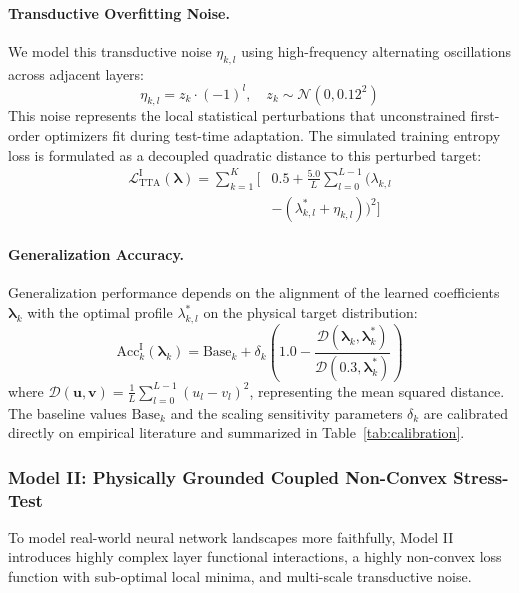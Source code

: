 \paragraph{Transductive Overfitting Noise.} We model this transductive noise $\eta_{k, l}$ using high-frequency alternating oscillations across adjacent layers:
\begin{equation}
\eta_{k, l} = z_k \cdot (-1)^l, \quad z_k \sim \mathcal{N}(0, 0.12^2)
\end{equation}
This noise represents the local statistical perturbations that unconstrained first-order optimizers fit during test-time adaptation. The simulated training entropy loss is formulated as a decoupled quadratic distance to this perturbed target:
\begin{equation}
\label{eq:model1_loss}
\begin{aligned}
\mathcal{L}_{\text{TTA}}^{\text{I}}(\boldsymbol{\lambda}) = \sum_{k=1}^K \bigg[ &0.5 + \frac{5.0}{L} \sum_{l=0}^{L-1} \Big( \lambda_{k, l} \\
&- (\lambda^*_{k, l} + \eta_{k, l}) \Big)^2 \bigg]
\end{aligned}
\end{equation}

\paragraph{Generalization Accuracy.} Generalization performance depends on the alignment of the learned coefficients $\boldsymbol{\lambda}_k$ with the optimal profile $\lambda^*_{k, l}$ on the physical target distribution:
\begin{equation}
\text{Acc}_k^{\text{I}}(\boldsymbol{\lambda}_k) = \text{Base}_k + \delta_k \left( 1.0 - \frac{\mathcal{D}(\boldsymbol{\lambda}_k, \boldsymbol{\lambda}^*_k)}{\mathcal{D}(\mathbf{0.3}, \boldsymbol{\lambda}^*_k)} \right)
\end{equation}
where $\mathcal{D}(\mathbf{u}, \mathbf{v}) = \frac{1}{L} \sum_{l=0}^{L-1} (u_l - v_l)^2$, representing the mean squared distance. The baseline values $\text{Base}_k$ and the scaling sensitivity parameters $\delta_k$ are calibrated directly on empirical literature and summarized in Table~\ref{tab:calibration}.

\subsubsection{Model II: Physically Grounded Coupled Non-Convex Stress-Test}
To model real-world neural network landscapes more faithfully, Model II introduces highly complex layer functional interactions, a highly non-convex loss function with sub-optimal local minima, and multi-scale transductive noise.

